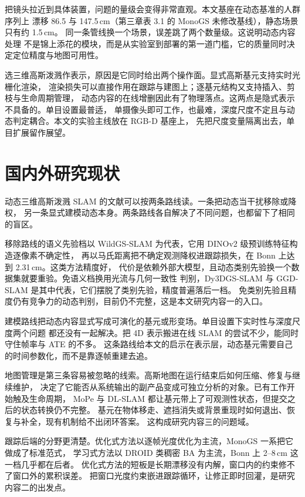 把镜头拉近到具体装置，问题的量级会变得非常直观。本文基座在动态基准的人群序列上
漂移 86.5 与 147.5\,cm（第三章表 3.1 的 MonoGS 未修改基线），静态场景只有约 1.5\,cm。
同一条管线换一个场景，误差跳了两个数量级。这说明动态内容处理
不是锦上添花的模块，而是从实验室到部署的第一道门槛，它的质量同时决定定位精度与地图可用性。

选三维高斯泼溅作表示，原因是它同时给出两个操作面。显式高斯基元支持实时光栅化渲染，
渲染损失可以直接作用在跟踪与建图上；逐基元结构又支持插入、剪枝与生命周期管理，
动态内容的在线增删因此有了物理落点。这两点是隐式表示不具备的。单目设置最普适，
单摄像头即可工作，也最难，深度尺度不定且与动态判定耦合。本文的实验主线放在 RGB-D 基座上，
先把尺度变量隔离出去，单目扩展留作展望。

\section{国内外研究现状}

动态三维高斯泼溅 SLAM 的文献可以按两条路线读。一条把动态当干扰移除或降权，
另一条显式建模动态本身。两条路线各自解决了不同问题，也都留下了相同的盲区。

移除路线的语义先验档以 WildGS-SLAM 为代表，它用 DINOv2 级预训练特征构造逐像素不确定性，
再以马氏距离把不确定观测降权进跟踪损失，在 Bonn 上达到 2.31\,cm。这类方法精度好，
代价是依赖外部大模型，且动态类别先验换一个数据集就要重验。免语义档换用光流与几何一致性
判别，Dy3DGS-SLAM 与 GGD-SLAM 是其中代表，它们摆脱了类别先验，精度普遍落后一档。
免类别先验且精度仍有竞争力的动态判别，目前仍不完整，这是本文研究内容一的入口。

建模路线把动态内容显式写成可演化的基元或形变场。单目设置下实时性与深度尺度两个问题
都还没有一起解决。把 4D 表示搬进在线 SLAM 的尝试不少，能同时守住帧率与 ATE 的不多。
这条路线给本文的启示在表示层，动态基元需要自己的时间参数化，而不是靠逐帧重建去追。

地图管理是第三条容易被忽略的线索。高斯地图在运行结束后如何压缩、修复与继续维护，
决定了它能否从系统输出的副产品变成可独立分析的对象。已有工作开始触及生命周期，
MoPe 与 DL-SLAM 都让基元带上了可观测性状态，但提交之后的状态转换仍不完整。
基元在物体移走、遮挡消失或背景重现时如何退出、恢复与补全，现有机制给不出闭环答案。
这构成研究内容三的问题域。

跟踪后端的分野更清楚。优化式方法以逐帧光度优化为主流，MonoGS 一系把它做成了标准范式，
学习式方法以 DROID 类稠密 BA 为主流，Bonn 上 2--8\,cm 这一档几乎都在后者。
优化式方法的短板是长期漂移没有内解，窗口内的约束修不了窗口外的累积误差。
把窗口光度约束嵌进跟踪循环，让修正即时回灌，是研究内容二的出发点。

